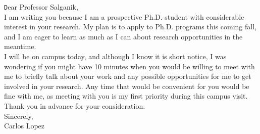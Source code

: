 \documentclass[aspectratio=169]{beamer}
\begin{document}
\begin{frame}

{\texttt
Dear Professor Salganik,\\ 

I am writing you because I am a prospective Ph.D. student with considerable interest in your research. My plan is to apply to Ph.D. programs this coming fall, and I am eager to learn as much as I can about research opportunities in the meantime.\\

I will be on campus today, and although I know it is short notice, I was wondering if you might have 10 minutes when you would be willing to meet with me to briefly talk about your work and any possible opportunities for me to get involved in your research. Any time that would be convenient for you would be fine with me, as meeting with you is my first priority during this campus visit.\\

Thank you in advance for your consideration.\\

Sincerely,\\
Carlos Lopez
}

\end{frame}
\end{document}
